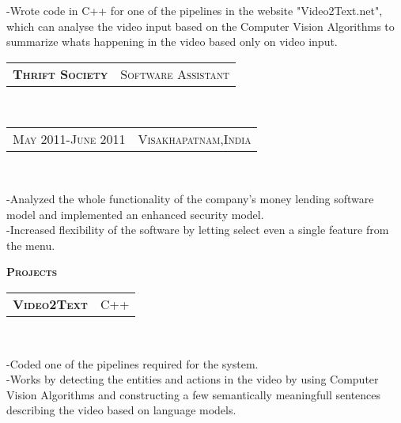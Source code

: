 \documentclass[10pt,a4paper,oneside]{article}
\begin{document}
    \begin{adjustwidth}{7pt}{0pt}
        {\footnotesize -Wrote code in C++ for one of the pipelines in the website "Video2Text.net", which can analyse 
        the video input based on the Computer Vision Algorithms to
        summarize whats happening in the video based only on video input.}\\
    \end{adjustwidth}
    \begin{tabular}{c|c}
        \textbf{\normalsize T\textsc{hrift} S\textsc{ociety}}
        &\textmd{\normalsize S\textsc{oftware} A\textsc{ssistant}}
    \end{tabular}\\
    \textcolor{light-gray}{
        \begin{tabular}{c|c}
            {\small M\textsc{ay 2011}-J\textsc{une 2011}}
            &{\small V\textsc{isakhapatnam},I\textsc{ndia}}
        \end{tabular}
    }\\ 
    \vspace{-4mm}
    \begin{adjustwidth}{7pt}{0pt}
        {\footnotesize -Analyzed the whole functionality of the company's money lending software model and implemented an enhanced security
        model.\\
    -Increased flexibility of the software by letting select even a single feature from the menu.}\\
    \end{adjustwidth}
    \textcolor{light-gray}{\textbf{\large P\textsc{rojects}}}
    \vspace{10pt}\\
    \begin{tabular}{c|c}
        \textbf{\normalsize V\textsc{ideo}2T\textsc{ext}}
        &\textmd{\normalsize C\textsc{++}}
    \end{tabular}\\
    \vspace{-4mm}
    \begin{adjustwidth}{7pt}{0pt}
        {\footnotesize -Coded one of the pipelines required
        for the system.\\
        -Works by detecting the entities and actions in the
        video by using Computer Vision Algorithms and constructing a few
        semantically meaningfull sentences describing the video
        based on language models.}\\
    \end{adjustwidth}
\end{document}
